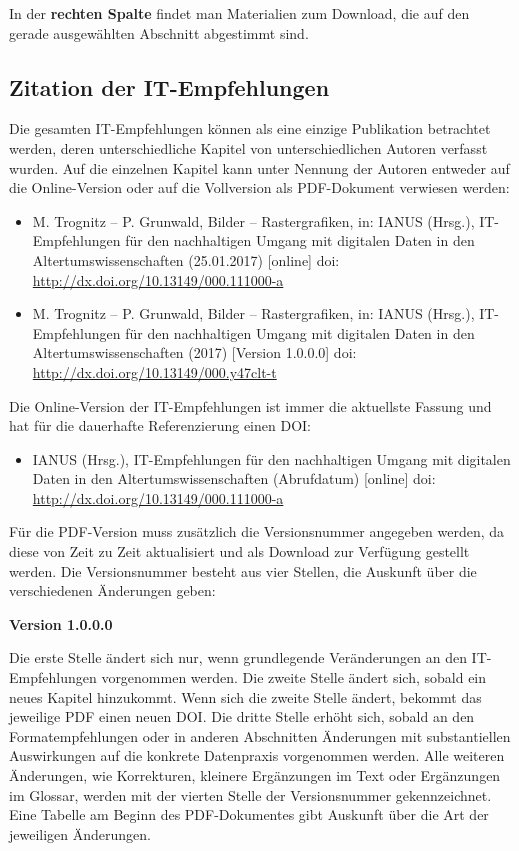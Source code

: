 In der \textbf{rechten Spalte} findet man Materialien zum Download, die auf den gerade ausgewählten Abschnitt abgestimmt sind.

\subsection*{Zitation der IT-Empfehlungen}
Die gesamten IT-Empfehlungen können als eine einzige Publikation betrachtet werden, deren unterschiedliche Kapitel von unterschiedlichen Autoren verfasst wurden. Auf die einzelnen Kapitel kann unter Nennung der Autoren entweder auf die Online-Version oder auf die Vollversion als PDF-Dokument verwiesen werden:
\begin{itemize}
	\item M. Trognitz -- P. Grunwald, Bilder -- Rastergrafiken, in: IANUS (Hrsg.), IT-Empfehlungen für den nachhaltigen Umgang mit digitalen Daten in den Altertumswissenschaften (25.01.2017) [online] doi: \url{http://dx.doi.org/10.13149/000.111000-a}
	\item M. Trognitz -- P. Grunwald, Bilder -- Rastergrafiken, in: IANUS (Hrsg.), IT-Empfehlungen für den nachhaltigen Umgang mit digitalen Daten in den Altertumswissenschaften (2017) [Version 1.0.0.0] doi: \url{http://dx.doi.org/10.13149/000.y47clt-t}
\end{itemize}

Die  Online-Version der IT-Empfehlungen ist immer die aktuellste Fassung und hat für die dauerhafte Referenzierung einen DOI:

\begin{itemize}
	\item IANUS (Hrsg.), IT-Empfehlungen für den nachhaltigen Umgang mit digitalen Daten in den Altertumswissenschaften (Abrufdatum) [online] doi: \url{http://dx.doi.org/10.13149/000.111000-a}
\end{itemize}

Für die PDF-Version muss zusätzlich die Versionsnummer angegeben werden, da diese von Zeit zu Zeit aktualisiert und als Download zur Verfügung gestellt werden. Die Versionsnummer besteht aus vier Stellen, die Auskunft über die verschiedenen Änderungen geben:

\begin{center}
	\Large \bfseries Version 1.0.0.0
\end{center}

Die erste Stelle ändert sich nur, wenn grundlegende Veränderungen an den IT-Empfehlungen vorgenommen werden. Die zweite Stelle ändert sich, sobald ein neues Kapitel hinzukommt. Wenn sich die zweite Stelle ändert, bekommt das jeweilige PDF einen neuen DOI. Die dritte Stelle erhöht sich, sobald an den Formatempfehlungen oder in anderen Abschnitten Änderungen mit substantiellen Auswirkungen auf die konkrete Datenpraxis vorgenommen werden. Alle weiteren Änderungen, wie Korrekturen, kleinere Ergänzungen im Text oder Ergänzungen im Glossar, werden mit der vierten Stelle der Versionsnummer gekennzeichnet. Eine Tabelle am Beginn des PDF-Dokumentes gibt Auskunft über die Art der jeweiligen Änderungen.

